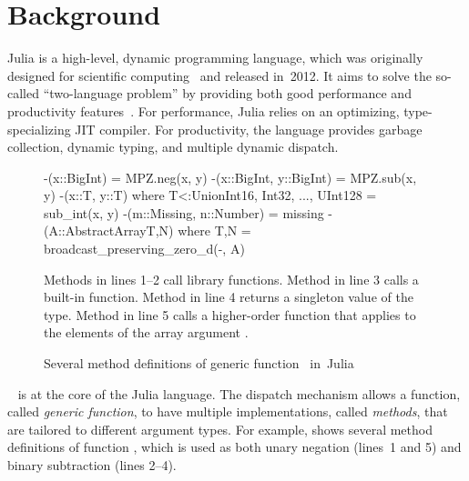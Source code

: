 \chapter{Background} %
\label{chap:background}


Julia is a high-level, dynamic programming language, which was originally
designed for scientific computing~\cite{bib:bezanson:julia-fresh:2017}
and released in~2012.
It aims to solve the so-called ``two-language problem''
by providing both good performance and productivity
features~\cite{bib:bezanson:julia-dyn-perf:oopsla:2018}.
For performance, Julia relies on an optimizing, type-specializing JIT compiler.
For productivity, the language provides garbage collection, dynamic typing, and
multiple dynamic dispatch.

\begin{figure}[t]
\begin{julia}
-(x::BigInt) = MPZ.neg(x, y)
-(x::BigInt, y::BigInt) = MPZ.sub(x, y)
-(x::T, y::T) where T<:Union{Int16, Int32, ..., UInt128} = sub_int(x, y)
-(m::Missing, n::Number) = missing
-(A::AbstractArray{T,N}) where {T,N} = broadcast_preserving_zero_d(-, A)
\end{julia}
\caption{Several method definitions of generic function~\cjl{(-)} in~Julia
}\label{fig:code:subtraction}
\begin{tablenotes}[para]
\small
Methods in lines 1--2 call library functions.
Method in line 3 calls a built-in function.
Method in line 4 returns a singleton value  of the  type.
Method in line 5 calls a higher-order function that applies \cjl{(-)} to the
elements of the array argument .
\end{tablenotes}
\end{figure}

~\cite{bib:bobrow:common-loops:1986,%
bib:chambers:multi-cecil:1992} is at the core of the Julia language.
The dispatch mechanism allows a function, called \emph{generic
function}, to have multiple implementations, called \emph{methods}, that are
tailored to different argument types. For example, 
shows several method definitions of function \cjl{(-)},
which is used as both unary negation (lines~1 and 5)
and binary subtraction (lines 2--4).

